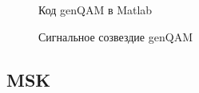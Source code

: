 \documentclass[a4paper,14pt]{extarticle}
\begin{document}
\begin{figure}[H]
\caption{Код genQAM в Matlab}
\label{7}
\end{figure}

\begin{figure}[H]
\caption{Сигнальное созвездие genQAM}
\label{8}
\end{figure}


\subsection{MSK}
\end{document}
